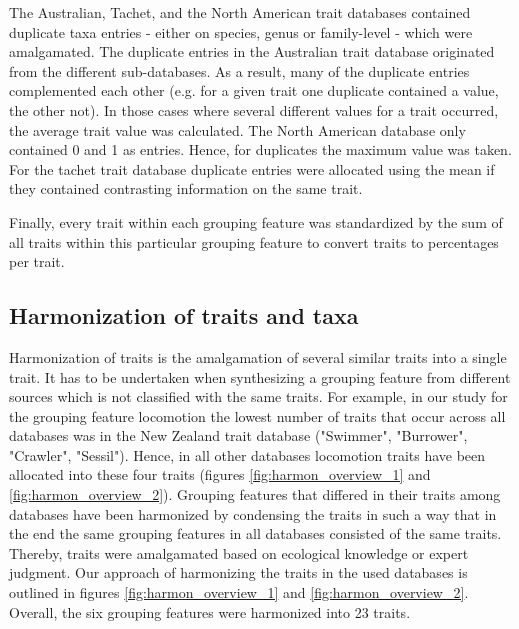 \documentclass{article}
\begin{document}

The Australian, Tachet, and the North American trait databases contained duplicate taxa entries - either on species, genus or family-level - which were amalgamated. The duplicate entries in the Australian trait database originated from the different sub-databases. As a result, many of the duplicate entries complemented each other (e.g. for a given trait one duplicate contained a value, the other not). In those cases where several different values for a trait occurred, the average trait value was calculated. The North American database only contained 0 and 1 as entries. Hence, for duplicates the maximum value was taken.
For the tachet trait database duplicate entries were allocated using the mean if they contained contrasting information on the same trait. 

Finally, every trait within each grouping feature was standardized by the sum of all traits within this particular grouping feature to convert traits to percentages per trait. 

\subsection{Harmonization of traits and taxa}

Harmonization of traits is the amalgamation of several similar traits into a single trait. It has to be undertaken when synthesizing a grouping feature from different sources which is not classified with the same traits. For example, in our study for the grouping feature locomotion the lowest number of traits that occur across all databases was in the New Zealand trait database ("Swimmer", "Burrower", "Crawler", "Sessil"). Hence, in all other databases locomotion traits have been allocated into these four traits (figures \ref{fig:harmon_overview_1} and \ref{fig:harmon_overview_2}).
Grouping features that differed in their traits among databases have been harmonized by condensing the traits in such a way that in the end the same grouping features in all databases consisted of the same traits. Thereby, traits were amalgamated based on ecological knowledge or expert judgment. %
Our approach of harmonizing the traits in the used databases is outlined in figures 
\ref{fig:harmon_overview_1} and \ref{fig:harmon_overview_2}. Overall, the six grouping features were harmonized into 23 traits.
\end{document}
